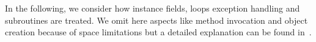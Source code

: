 In the following, we consider how instance fields, %
loops exception handling and subroutines are treated. We omit here aspects like method invocation and object creation because of space limitations but a detailed explanation can be found in~\cite{JBL05MP}. 

%






